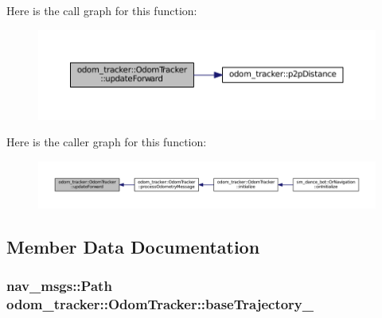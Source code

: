 Here is the call graph for this function\+:
\nopagebreak
\begin{figure}[H]
\begin{center}
\leavevmode
\includegraphics[width=350pt]{classodom__tracker_1_1OdomTracker_a248c89552c36c6df65a0d3b9aa58cce6_cgraph}
\end{center}
\end{figure}




Here is the caller graph for this function\+:
\nopagebreak
\begin{figure}[H]
\begin{center}
\leavevmode
\includegraphics[width=350pt]{classodom__tracker_1_1OdomTracker_a248c89552c36c6df65a0d3b9aa58cce6_icgraph}
\end{center}
\end{figure}




\subsection{Member Data Documentation}
\subsubsection[{\texorpdfstring{base\+Trajectory\+\_\+}{baseTrajectory_}}]{\setlength{\rightskip}{0pt plus 5cm}nav\+\_\+msgs\+::\+Path odom\+\_\+tracker\+::\+Odom\+Tracker\+::base\+Trajectory\+\_\+\hspace{0.3cm}{\ttfamily [protected]}}\hypertarget{classodom__tracker_1_1OdomTracker_a889adca220c33056d9a582eceda64adc}{}\label{classodom__tracker_1_1OdomTracker_a889adca220c33056d9a582eceda64adc}


